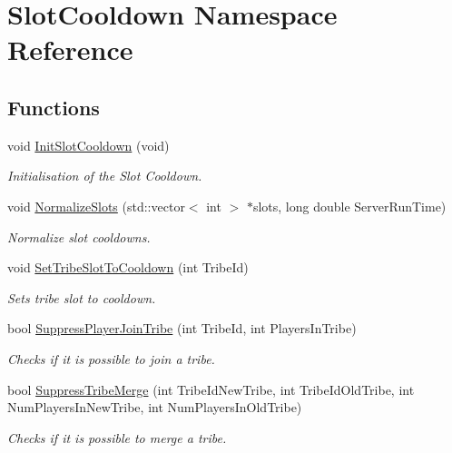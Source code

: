 \hypertarget{namespace_slot_cooldown}{}\section{Slot\+Cooldown Namespace Reference}
\label{namespace_slot_cooldown}
\subsection*{Functions}
\begin{DoxyCompactItemize}
\item 
void \mbox{\hyperlink{namespace_slot_cooldown_af1d102851d318b69e6b808f8c1b0f6fa}{Init\+Slot\+Cooldown}} (void)
\begin{DoxyCompactList}\small\item\em Initialisation of the Slot Cooldown. \end{DoxyCompactList}\item 
void \mbox{\hyperlink{namespace_slot_cooldown_acadf0d52f01444ce96d02fefd725abe8}{Normalize\+Slots}} (std\+::vector$<$ int $>$ $\ast$slots, long double Server\+Run\+Time)
\begin{DoxyCompactList}\small\item\em Normalize slot cooldowns. \end{DoxyCompactList}\item 
void \mbox{\hyperlink{namespace_slot_cooldown_ad36d7fcdac6fac169b44ce05b3ea98f9}{Set\+Tribe\+Slot\+To\+Cooldown}} (int Tribe\+Id)
\begin{DoxyCompactList}\small\item\em Sets tribe slot to cooldown. \end{DoxyCompactList}\item 
bool \mbox{\hyperlink{namespace_slot_cooldown_af34a0fce4996c0cb1f108dea38c9c00c}{Suppress\+Player\+Join\+Tribe}} (int Tribe\+Id, int Players\+In\+Tribe)
\begin{DoxyCompactList}\small\item\em Checks if it is possible to join a tribe. \end{DoxyCompactList}\item 
bool \mbox{\hyperlink{namespace_slot_cooldown_aa61b482a7729c7eb2a23d068f74477c3}{Suppress\+Tribe\+Merge}} (int Tribe\+Id\+New\+Tribe, int Tribe\+Id\+Old\+Tribe, int Num\+Players\+In\+New\+Tribe, int Num\+Players\+In\+Old\+Tribe)
\begin{DoxyCompactList}\small\item\em Checks if it is possible to merge a tribe. \end{DoxyCompactList}\end{DoxyCompactItemize}
